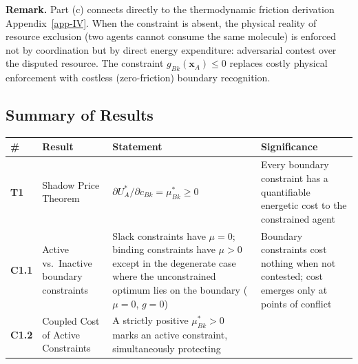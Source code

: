 \documentclass[11pt]{article}
\theoremstyle{plain}
\theoremstyle{definition}
\theoremstyle{remark}
\newcounter{none}
\let\origsubsection\subsection
\renewcommand{\subsection}{\needspace{7\baselineskip}\origsubsection}
\begin{document}
\textbf{Remark.} Part (c) connects directly to the thermodynamic
friction derivation Appendix~\ref{app-IV}. When the constraint is
absent, the physical reality of resource exclusion (two agents cannot
consume the same molecule) is enforced not by coordination but by direct
energy expenditure: adversarial contest over the disputed resource. The
constraint \(g_{Bk}(\mathbf{x}_A) \leq 0\) replaces costly physical
enforcement with costless (zero-friction) boundary recognition.

\subsection{Summary of Results}\label{summary-of-results}

{\def\LTcaptype{none} %
\begin{longtable}[]{@{}
  >{\raggedright\arraybackslash}p{}
  >{\raggedright\arraybackslash}p{}
  >{\raggedright\arraybackslash}p{}
  >{\raggedright\arraybackslash}p{}@{}}
\toprule\noalign{}
\begin{minipage}[b]{\linewidth}\raggedright
\#
\end{minipage} & \begin{minipage}[b]{\linewidth}\raggedright
Result
\end{minipage} & \begin{minipage}[b]{\linewidth}\raggedright
Statement
\end{minipage} & \begin{minipage}[b]{\linewidth}\raggedright
Significance
\end{minipage} \\
\midrule\noalign{}
\endhead
\bottomrule\noalign{}
\endlastfoot
\textbf{T1} & Shadow Price Theorem &
\(\partial U_A^* / \partial c_{Bk} = \mu_{Bk}^* \geq 0\) & Every
boundary constraint has a quantifiable energetic cost to the constrained
agent \\
\textbf{C1.1} & Active vs.~Inactive boundary constraints & Slack
constraints have \(\mu = 0\); binding constraints have \(\mu > 0\)
except in the degenerate case where the unconstrained optimum lies on
the boundary (\(\mu = 0\), \(g = 0\)) & Boundary constraints cost
nothing when not contested; cost emerges only at points of conflict \\
\textbf{C1.2} & Coupled Cost of Active Constraints & A strictly positive
\(\mu_{Bk}^* > 0\) marks an active constraint, simultaneously protecting

\end{longtable}}
\end{document}
